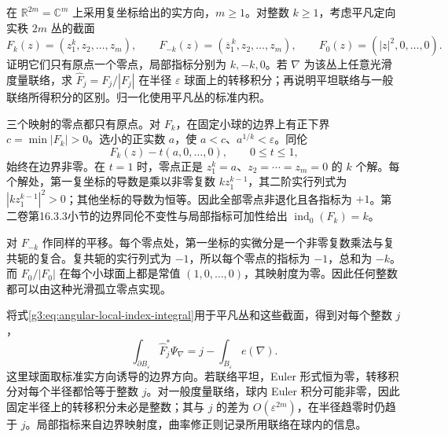 \begin{exercise}\label{g3:ex:angular-integral-arbitrary-index}
	在 \(\mathbb R^{2m}=\mathbb C^m\) 上采用复坐标给出的实方向，\(m\ge1\)。对整数 \(k\ge1\)，考虑平凡定向实秩 \(2m\) 丛的截面
	\[
		F_k(z)=(z_1^k,z_2,\ldots,z_m),\qquad
		F_{-k}(z)=(\overline z_1^{\,k},z_2,\ldots,z_m),
		\qquad F_0(z)=(|z|^2,0,\ldots,0).
	\]
	证明它们只有原点一个零点，局部指标分别为 \(k,-k,0\)。若 \(\nabla\) 为该丛上任意光滑度量联络，求 \(\widehat F_j=F_j/|F_j|\) 在半径 \(\varepsilon\) 球面上的转移积分；再说明平坦联络与一般联络所得积分的区别。归一化使用平凡丛的标准内积。
\end{exercise}
\begin{solution}
	三个映射的零点都只有原点。对 \(F_k\)，在固定小球的边界上有正下界 \(c=\min|F_k|>0\)。选小的正实数 \(a\)，使 \(a<c\)、\(a^{1/k}<\varepsilon\)。同伦
	\[
		F_k(z)-t(a,0,\ldots,0),\qquad 0\le t\le1,
	\]
	始终在边界非零。在 \(t=1\) 时，零点正是 \(z_1^k=a\)、\(z_2=\cdots=z_m=0\) 的 \(k\) 个解。每个解处，第一复坐标的导数是乘以非零复数 \(kz_1^{k-1}\)，其二阶实行列式为 \(|kz_1^{k-1}|^2>0\)；其他坐标的导数为恒等。因此全部零点非退化且各指标为 \(+1\)。第二卷第16.3.3小节的边界同伦不变性与局部指标可加性给出 \(\operatorname{ind}_0(F_k)=k\)。

	对 \(F_{-k}\) 作同样的平移。每个零点处，第一坐标的实微分是一个非零复数乘法与复共轭的复合。复共轭的实行列式为 \(-1\)，所以每个零点的指标为 \(-1\)，总和为 \(-k\)。而 \(F_0/|F_0|\) 在每个小球面上都是常值 \((1,0,\ldots,0)\)，其映射度为零。因此任何整数都可以由这种光滑孤立零点实现。

	将式\eqref{g3:eq:angular-local-index-integral}用于平凡丛和这些截面，得到对每个整数 \(j\)，
	\[
		\int_{\partial B_\varepsilon}\widehat F_j^*\Psi_\nabla
		=j-\int_{B_\varepsilon}e(\nabla).
	\]
	这里球面取标准实方向诱导的边界方向。若联络平坦，Euler 形式恒为零，转移积分对每个半径都恰等于整数 \(j\)。对一般度量联络，球内 Euler 积分可能非零，因此固定半径上的转移积分未必是整数；其与 \(j\) 的差为 \(O(\varepsilon^{2m})\)，在半径趋零时仍趋于 \(j\)。局部指标来自边界映射度，曲率修正则记录所用联络在球内的信息。
\end{solution}

